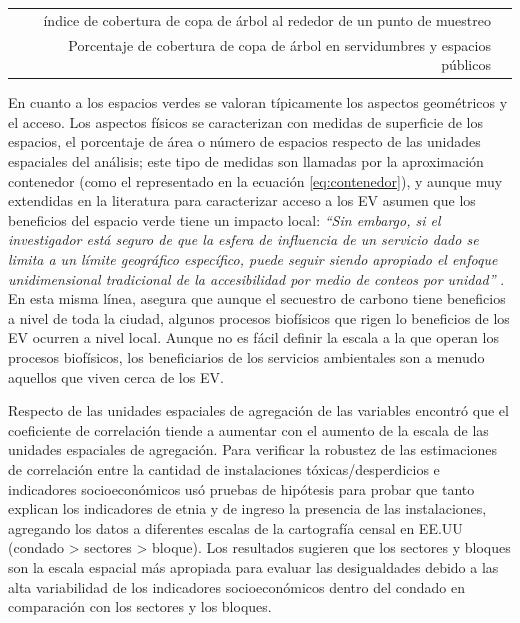 \documentclass[12pt,]{book}
\begin{document}
\begin{longtable}[]{@{}rr@{}}
\begin{minipage}[t]{0.57\columnwidth}
índice de cobertura de copa de árbol al rededor de un punto de
muestreo\strut
\end{minipage} & \begin{minipage}[t]{0.31\columnwidth}\raggedleft\strut
\citep{zhou_social_2013}\strut
\end{minipage}\tabularnewline
\begin{minipage}[t]{0.57\columnwidth}\raggedleft\strut
Porcentaje de cobertura de copa de árbol en servidumbres y espacios
públicos\strut
\end{minipage} & \begin{minipage}[t]{0.31\columnwidth}\raggedleft\strut
\citep{landry_street_2009}\strut
\end{minipage}\tabularnewline
\bottomrule
\end{longtable}

En cuanto a los espacios verdes se valoran típicamente los aspectos
geométricos y el acceso. Los aspectos físicos se caracterizan con
medidas de superficie de los espacios, el porcentaje de área o número de
espacios respecto de las unidades espaciales del análisis; este tipo de
medidas son llamadas por \citep{talen_assessing_1998} la aproximación
contenedor (como el representado en la ecuación \eqref{eq:contenedor}), y
aunque muy extendidas en la literatura para caracterizar acceso a los EV
asumen que los beneficios del espacio verde tiene un impacto local:
\emph{``Sin embargo, si el investigador está seguro de que la esfera de
influencia de un servicio dado se limita a un límite geográfico
específico, puede seguir siendo apropiado el enfoque unidimensional
tradicional de la accesibilidad por medio de conteos por unidad''}
\citep{talen_assessing_1998}. En esta misma línea,
\citep{kabisch_green_2014} asegura que aunque el secuestro de carbono
tiene beneficios a nivel de toda la ciudad, algunos procesos biofísicos
que rigen lo beneficios de los EV ocurren a nivel local. Aunque no es
fácil definir la escala a la que operan los procesos biofísicos, los
beneficiarios de los servicios ambientales son a menudo aquellos que
viven cerca de los EV.

Respecto de las unidades espaciales de agregación de las variables
\citep{cutter_role_1996} encontró que el coeficiente de correlación
tiende a aumentar con el aumento de la escala de las unidades espaciales
de agregación. Para verificar la robustez de las estimaciones de
correlación entre la cantidad de instalaciones tóxicas/desperdicios e
indicadores socioeconómicos \citet{cutter_role_1996} usó pruebas de
hipótesis para probar que tanto explican los indicadores de etnia y de
ingreso la presencia de las instalaciones, agregando los datos a
diferentes escalas de la cartografía censal en EE.UU (condado
\textgreater{} sectores \textgreater{} bloque). Los resultados sugieren
que los sectores y bloques son la escala espacial más apropiada para
evaluar las desigualdades debido a las alta variabilidad de los
indicadores socioeconómicos dentro del condado en comparación con los
sectores y los bloques.
\end{document}
